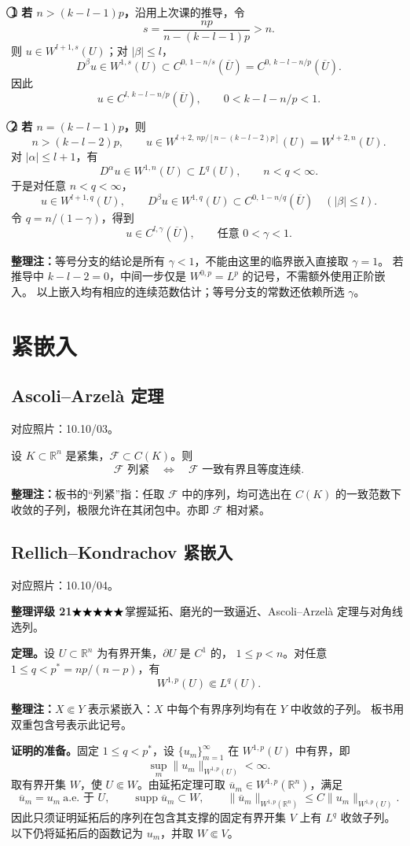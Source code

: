 \documentclass[UTF8,a4paper,11pt,fontset=fandol]{ctexart}
\newcommand{\R}{\mathbb R}
\newcommand{\ednote}[1]{\par{\small\color{notegray}\textbf{整理注：}#1}\par}
\newcommand{\source}[1]{{\small\color{notegray}对应照片：#1。}\par}
\newcommand{\proofstars}[1]{\ensuremath{%
\ifnum#1>0\relax\bigstar\fi
\ifnum#1>1\relax\bigstar\fi
\ifnum#1>2\relax\bigstar\fi
\ifnum#1>3\relax\bigstar\fi
\ifnum#1>4\relax\bigstar\fi}}
\newcommand{\proofrating}[3]{\par{\small\color{proofblue}%
\textbf{整理评级 #1}\enspace\proofstars{#2}\quad #3\par}}
\begin{document}
\textbf{\textcircled{1} 若 $n>(k-l-1)p$，}沿用上次课的推导，令
\[
s=\frac{np}{n-(k-l-1)p}>n.
\]
则 $u\in W^{l+1,s}(U)$；对 $|\beta|\leq l$，
\[
D^\beta u\in W^{1,s}(U)
\subset C^{0,\,1-n/s}(\overline U)
=C^{0,\,k-l-n/p}(\overline U).
\]
因此
\[
\boxed{u\in C^{l,\,k-l-n/p}(\overline U),\qquad 0<k-l-n/p<1.}
\]

\textbf{\textcircled{2} 若 $n=(k-l-1)p$，}则
\[
n>(k-l-2)p,\qquad
u\in W^{l+2,\,np/[n-(k-l-2)p]}(U)=W^{l+2,n}(U).
\]
对 $|\alpha|\leq l+1$，有
\[
D^\alpha u\in W^{1,n}(U)\subset L^q(U),\qquad n<q<\infty.
\]
于是对任意 $n<q<\infty$，
\[
u\in W^{l+1,q}(U),\qquad
D^\beta u\in W^{1,q}(U)\subset C^{0,\,1-n/q}(\overline U)
\quad(|\beta|\leq l).
\]
令 $q=n/(1-\gamma)$，得到
\[
\boxed{u\in C^{l,\gamma}(\overline U),\qquad\text{任意 }0<\gamma<1.}
\]
\ednote{等号分支的结论是所有 $\gamma<1$，不能由这里的临界嵌入直接取 $\gamma=1$。
若推导中 $k-l-2=0$，中间一步仅是 $W^{0,p}=L^p$ 的记号，不需额外使用正阶嵌入。
以上嵌入均有相应的连续范数估计；等号分支的常数还依赖所选 $\gamma$。}

\newpage
\section{紧嵌入}
\subsection*{Ascoli--Arzelà 定理}
\source{10.10/03}
设 $K\subset\R^n$ 是紧集，$\mathcal F\subset C(K)$。则
\[
\boxed{\mathcal F\text{ 列紧}
\quad\Longleftrightarrow\quad
\mathcal F\text{ 一致有界且等度连续}.}
\]
\ednote{板书的“列紧”指：任取 $\mathcal F$ 中的序列，均可选出在 $C(K)$
的一致范数下收敛的子列，极限允许在其闭包中。亦即 $\mathcal F$ 相对紧。}

\subsection{Rellich--Kondrachov 紧嵌入}
\source{10.10/04}
\proofrating{21}{5}{掌握延拓、磨光的一致逼近、Ascoli--Arzelà 定理与对角线选列。}
\textbf{定理。}设 $U\subset\R^n$ 为有界开集，$\partial U$ 是 $C^1$ 的，
$1\leq p<n$。对任意 $1\leq q<p^*=np/(n-p)$，有
\[
\boxed{W^{1,p}(U)\Subset L^q(U).}
\]
\ednote{$X\Subset Y$ 表示紧嵌入：$X$ 中每个有界序列均有在 $Y$ 中收敛的子列。
板书用双重包含号表示此记号。}

\textbf{证明的准备。}固定 $1\leq q<p^*$，设 $\{u_m\}_{m=1}^\infty$
在 $W^{1,p}(U)$ 中有界，即
\[
\sup_m\|u_m\|_{W^{1,p}(U)}<\infty.
\]
取有界开集 $W$，使 $U\Subset W$。由延拓定理可取
$\overline u_m\in W^{1,p}(\R^n)$，满足
\[
\overline u_m=u_m\ \text{a.e. 于 }U,\qquad
\operatorname{supp}\overline u_m\subset W,\qquad
\|\overline u_m\|_{W^{1,p}(\R^n)}
\leq C\|u_m\|_{W^{1,p}(U)}.
\]
因此只须证明延拓后的序列在包含其支撑的固定有界开集 $V$ 上有 $L^q$ 收敛子列。
以下仍将延拓后的函数记为 $u_m$，并取 $W\Subset V$。
\end{document}
